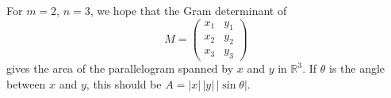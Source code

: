 \begin{example}[$m=2,\ n=3$: area of a parallelogram in $\mathbb{R}^3$]
\label{ex:gram_m2_n3_area}
For $m=2$, $n=3$, we hope that the Gram determinant of
\[M = \begin{pmatrix} x_1 & y_1 \\ x_2 & y_2 \\ x_3 & y_3 \end{pmatrix}\]
gives the area of the parallelogram spanned by $x$ and $y$ in $\mathbb{R}^3$. If $\theta$ is
the angle between $x$ and $y$, this should be $A = |x|\,|y|\,|\sin\theta|$.


\end{example}
